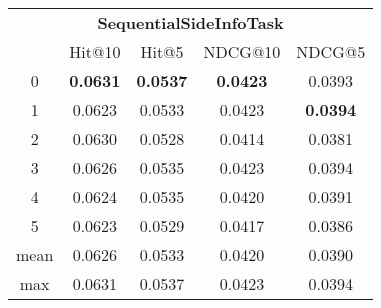 \documentclass{article}
\begin{document}
 

\begin{tabular}{c|cccc}

\multicolumn{5}{c}{\textbf{SequentialSideInfoTask}} \\
\noalign{\smallskip}
\noalign{\smallskip}
\toprule
\multicolumn{1}{c}{Template ID} & \multicolumn{1}{|c}{Hit@10} & \multicolumn{1}{c}{Hit@5} & \multicolumn{1}{c}{NDCG@10} & \multicolumn{1}{c}{NDCG@5} \\
\midrule
0 & \textbf{0.0631} & \textbf{0.0537} & \textbf{0.0423} & 0.0393 \\
1 & 0.0623 & 0.0533 & 0.0423 & \textbf{0.0394} \\
2 & 0.0630 & 0.0528 & 0.0414 & 0.0381 \\
3 & 0.0626 & 0.0535 & 0.0423 & 0.0394 \\
4 & 0.0624 & 0.0535 & 0.0420 & 0.0391 \\
5 & 0.0623 & 0.0529 & 0.0417 & 0.0386 \\
\midrule
mean & 0.0626 & 0.0533 & 0.0420 & 0.0390 \\
max & 0.0631 & 0.0537 & 0.0423 & 0.0394 \\
\bottomrule

\end{tabular}
\end{document}
